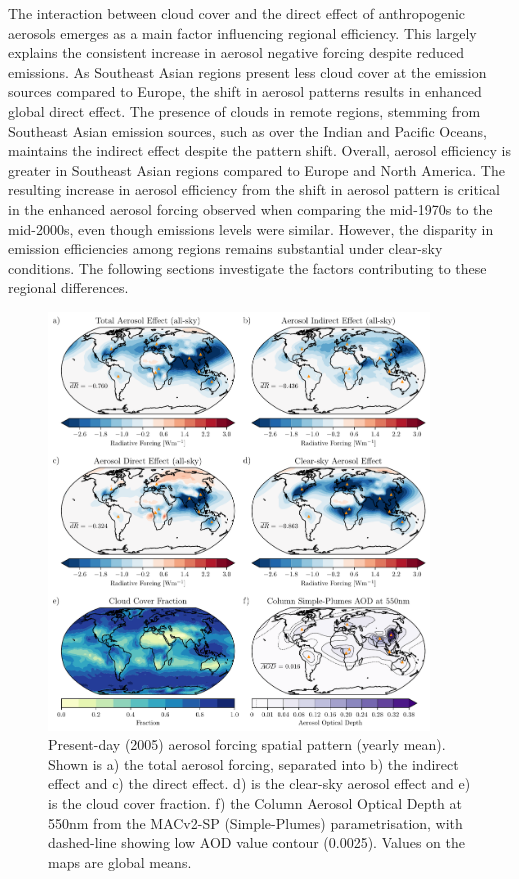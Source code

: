 \documentclass[draft]{agujournal2019}
\begin{document}
            The interaction between cloud cover and the direct effect of anthropogenic aerosols emerges as a main factor influencing regional efficiency. This largely explains the consistent increase in aerosol negative forcing despite reduced emissions. As Southeast Asian regions present less cloud cover at the emission sources compared to Europe, the shift in aerosol patterns results in enhanced global direct effect. The presence of clouds in remote regions, stemming from Southeast Asian emission sources, such as over the Indian and Pacific Oceans, maintains the indirect effect despite the pattern shift. Overall, aerosol efficiency is greater in Southeast Asian regions compared to Europe and North America.
            The resulting increase in aerosol efficiency from the shift in aerosol pattern is critical in the enhanced aerosol forcing observed when comparing the mid-1970s to the mid-2000s, even though emissions levels were similar.
            However, the disparity in emission efficiencies among regions remains substantial under clear-sky conditions. The following sections investigate the factors contributing to these regional differences.
            
      \begin{figure}
            \centering
            \includegraphics[width=0.9\textwidth]{../../figures/figure3}
            \caption{Present-day (2005) aerosol forcing spatial pattern (yearly mean). Shown is a) the total aerosol forcing, separated into b) the indirect effect and c) the direct effect. d) is the clear-sky aerosol effect and e) is the cloud cover fraction. f) the Column Aerosol Optical Depth at 550nm from the MACv2-SP (Simple-Plumes) parametrisation, with dashed-line showing low AOD value contour (0.0025). Values on the maps are global means.}
            \label{fig:figure3}
      \end{figure}
\end{document}
